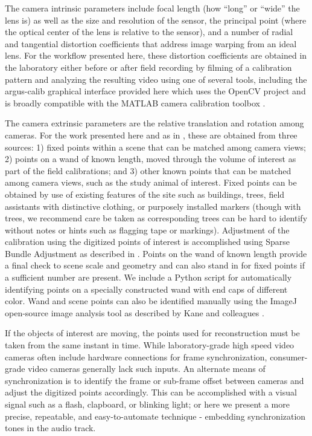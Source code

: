 \documentclass[fleqn,10pt]{wlpeerj}
\begin{document}
The camera intrinsic parameters include focal length (how ``long'' or ``wide'' the lens is) as well as the size and resolution of the sensor, the principal point (where the optical center of the lens is relative to the sensor), and a number of radial and tangential distortion coefficients that address image warping from an ideal lens. For the workflow presented here, these distortion coefficients are obtained in the laboratory either before or after field recording by filming of a calibration pattern and analyzing the resulting video using one of several tools, including the argus-calib graphical interface provided here which uses the OpenCV project \citep{opencv} and is broadly compatible with the MATLAB camera calibration toolbox \citep{lour09}.  

The camera extrinsic parameters are the relative translation and rotation among cameras.  For the work presented here and as in \citep{Theriault:2014}, these are obtained from three sources: 1) fixed points within a scene that can be matched among camera views; 2) points on a wand of known length, moved through the volume of interest as part of the field calibrations; and 3) other known points that can be matched among camera views, such as the study animal of interest. Fixed points can be obtained by use of existing features of the site such as buildings, trees, field assistants with distinctive clothing, or purposely installed markers (though with trees, we recommend care be taken as corresponding trees can be hard to identify without notes or hints such as flagging tape or markings).  Adjustment of the calibration using the digitized points of interest is accomplished using Sparse Bundle Adjustment as described in \citep{lour09, Theriault:2014}.  Points on the wand of known length provide a final check to scene scale and geometry and can also stand in for fixed points if a sufficient number are present. We include a Python script for automatically identifying points on a specially constructed wand with end caps of different color. Wand and scene points can also be identified manually using the ImageJ open-source image analysis tool as described by Kane and colleagues \citep{Kane2012}.

If the objects of interest are moving, the points used for reconstruction must be taken from the same instant in time.  While laboratory-grade high speed video cameras often include hardware connections for frame synchronization, consumer-grade video cameras generally lack such inputs. An alternate means of synchronization is to identify the frame or sub-frame offset between cameras and adjust the digitized points accordingly.  This can be accomplished with a visual signal such as a flash, clapboard, or blinking light; or here we present a more precise, repeatable, and easy-to-automate technique - embedding synchronization tones in the audio track. 
\end{document}
